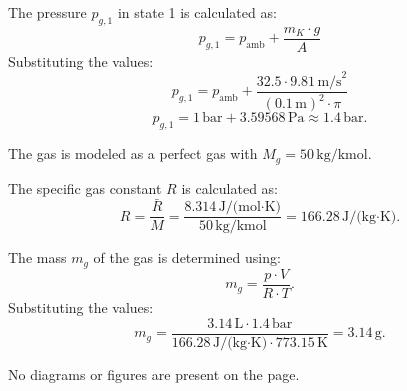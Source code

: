 The pressure \( p_{g,1} \) in state 1 is calculated as:  
\[
p_{g,1} = p_{\text{amb}} + \frac{m_K \cdot g}{A}
\]  
Substituting the values:  
\[
p_{g,1} = p_{\text{amb}} + \frac{32.5 \cdot 9.81 \, \text{m/s}^2}{\left(0.1 \, \text{m}\right)^2 \cdot \pi}
\]  
\[
p_{g,1} = 1 \, \text{bar} + 3.59568 \, \text{Pa} \approx 1.4 \, \text{bar}.
\]  

The gas is modeled as a perfect gas with \( M_g = 50 \, \text{kg/kmol} \).  

The specific gas constant \( R \) is calculated as:  
\[
R = \frac{\bar{R}}{M} = \frac{8.314 \, \text{J/(mol·K)}}{50 \, \text{kg/kmol}} = 166.28 \, \text{J/(kg·K)}.
\]  

The mass \( m_g \) of the gas is determined using:  
\[
m_g = \frac{p \cdot V}{R \cdot T}.
\]  
Substituting the values:  
\[
m_g = \frac{3.14 \, \text{L} \cdot 1.4 \, \text{bar}}{166.28 \, \text{J/(kg·K)} \cdot 773.15 \, \text{K}} = 3.14 \, \text{g}.
\]  

No diagrams or figures are present on the page.